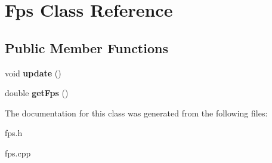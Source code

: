 \hypertarget{class_fps}{
\section{Fps Class Reference}
\label{class_fps}
}
\subsection*{Public Member Functions}
\begin{DoxyCompactItemize}
\item 
\hypertarget{class_fps_ad21214aca72da7793640e5cb5938f891}{
void {\bfseries update} ()}
\label{class_fps_ad21214aca72da7793640e5cb5938f891}

\item 
\hypertarget{class_fps_ad6a27920c8a22b237108e9cc4aa97251}{
double {\bfseries getFps} ()}
\label{class_fps_ad6a27920c8a22b237108e9cc4aa97251}

\end{DoxyCompactItemize}


The documentation for this class was generated from the following files:\begin{DoxyCompactItemize}
\item 
fps.h\item 
fps.cpp\end{DoxyCompactItemize}
